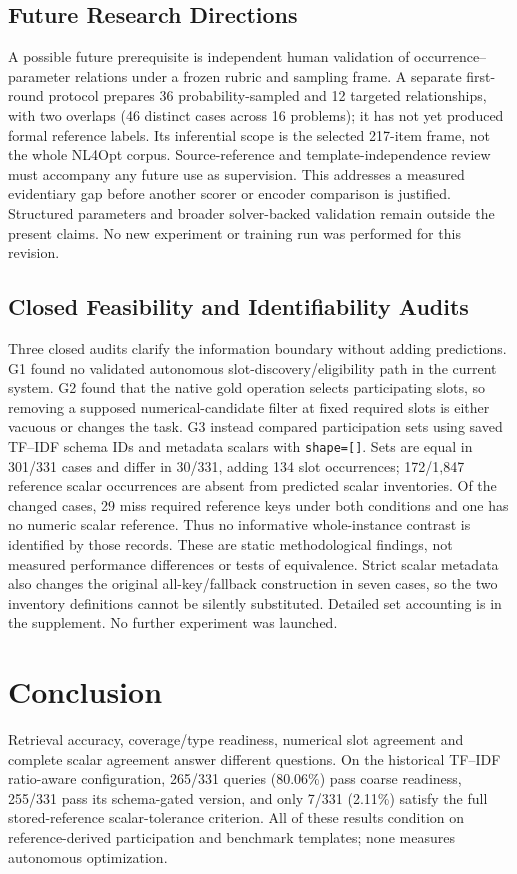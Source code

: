 \documentclass[pdflatex,sn-basic,Numbered]{sn-jnl}
\begin{document}
\subsection{Future Research Directions}
\label{subsec:future_work}

A possible future prerequisite is independent human validation of occurrence--parameter relations under a frozen rubric and sampling frame. A separate first-round protocol prepares 36 probability-sampled and 12 targeted relationships, with two overlaps (46 distinct cases across 16 problems); it has not yet produced formal reference labels. Its inferential scope is the selected 217-item frame, not the whole NL4Opt corpus. Source-reference and template-independence review must accompany any future use as supervision. This addresses a measured evidentiary gap before another scorer or encoder comparison is justified. Structured parameters and broader solver-backed validation remain outside the present claims. No new experiment or training run was performed for this revision.



\subsection{Closed Feasibility and Identifiability Audits}
\label{subsec:closed-audits}
Three closed audits clarify the information boundary without adding predictions. G1 found no validated autonomous slot-discovery/eligibility path in the current system. G2 found that the native gold operation selects participating slots, so removing a supposed numerical-candidate filter at fixed required slots is either vacuous or changes the task. G3 instead compared participation sets using saved TF--IDF schema IDs and metadata scalars with \texttt{shape=[]}. Sets are equal in 301/331 cases and differ in 30/331, adding 134 slot occurrences; 172/1,847 reference scalar occurrences are absent from predicted scalar inventories. Of the changed cases, 29 miss required reference keys under both conditions and one has no numeric scalar reference. Thus no informative whole-instance contrast is identified by those records. These are static methodological findings, not measured performance differences or tests of equivalence. Strict scalar metadata also changes the original all-key/fallback construction in seven cases, so the two inventory definitions cannot be silently substituted. Detailed set accounting is in the supplement. No further experiment was launched.
\section{Conclusion}
\label{sec:conclusion}
Retrieval accuracy, coverage/type readiness, numerical slot agreement and complete scalar agreement answer different questions. On the historical TF--IDF ratio-aware configuration, 265/331 queries (80.06\%) pass coarse readiness, 255/331 pass its schema-gated version, and only 7/331 (2.11\%) satisfy the full stored-reference scalar-tolerance criterion. All of these results condition on reference-derived participation and benchmark templates; none measures autonomous optimization.
\end{document}
